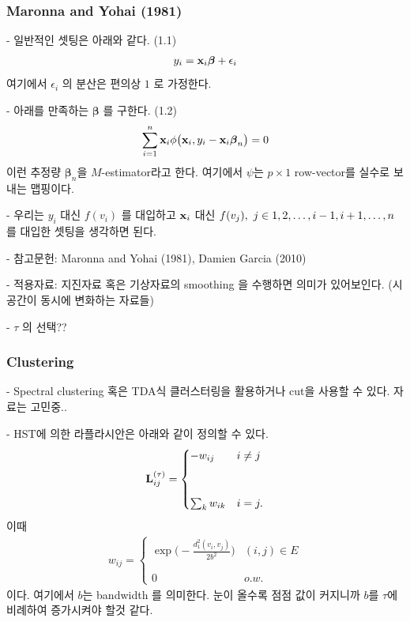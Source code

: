 \documentclass[preprint, review, 12pt]{article}
\theoremstyle{definition}
\theoremstyle{remark}
\begin{document}
\subsubsection*{Maronna and Yohai (1981)}

- 일반적인 셋팅은 아래와 같다. (1.1) 
\begin{align}
y_i={\bf x}_ i \boldsymbol{\beta}  +\epsilon_i 
\end{align}
여기에서 $\epsilon_i$ 의 분산은 편의상 $1$ 로 가정한다. 

- 아래를 만족하는 $\boldsymbol{\beta}$ 를 구한다. (1.2) 
\begin{align}
\sum_{i=1}^{n}{\bf x}_ i \phi\big({\bf x}_ i , y_i-{\bf x}_ i \boldsymbol{\beta}_ n\big) =0 
\end{align}
이런 추정량 $\boldsymbol{\beta}_ n$을 $M$-estimator라고 한다. 여기에서 $\psi$는 $p\times 1$ row-vector를 실수로 보내는 맵핑이다. 

- 우리는 $y_i$ 대신 $f(v_i)$ 를 대입하고 ${\bf x}_ i$ 대신 $f(v_j),~ j\in\\{1,2,\dots,i-1,i+1,\dots,n\\}$ 를 대입한 셋팅을 생각하면 된다. 

- 참고문헌: Maronna and Yohai (1981), Damien Garcia (2010) 

- 적용자료: 지진자료 혹은 기상자료의 smoothing 을 수행하면 의미가 있어보인다. (시공간이 동시에 변화하는 자료들) 

- $\tau$ 의 선택??

\subsubsection*{Clustering}

- Spectral clustering 혹은 TDA식 클러스터링을 활용하거나 cut을 사용할 수 있다. 자료는 고민중.. 

- HST에 의한 라플라시안은 아래와 같이 정의할 수 있다. 
\begin{align}
{\bf L}_ {ij}^{(\tau)}=
\begin{cases} 
-w_{ij} & i\neq j \\\\ \\
\sum_k w_{ik} & i=j. 
\end{cases} 
\end{align} 
이때 
\begin{align}
w_{ij}=\begin{cases}
\exp \Big(-\frac{d_1^2(v_i,v_j)}{2b^2}\Big) & (i,j) \in E \\\\ \\
0 & o.w.
\end{cases}
\end{align}
이다. 여기에서 $b$는 bandwidth 를 의미한다. 눈이 올수록 점점 값이 커지니까 $b$를 $\tau$에 비례하여 증가시켜야 할것 같다. 
\end{document}
